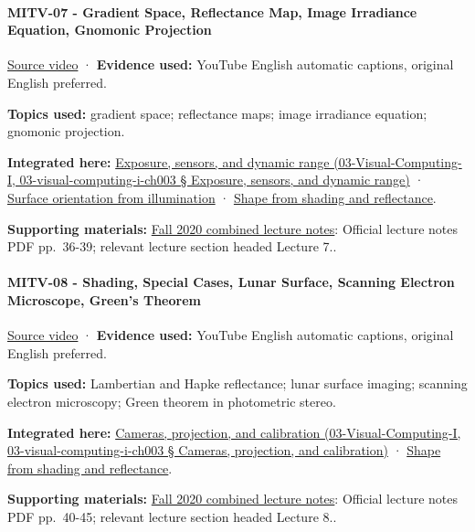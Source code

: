 \paragraph{MITV-07 - Gradient Space, Reflectance Map, Image Irradiance Equation, Gnomonic Projection}\label{mitv-07---gradient-space-reflectance-map-image-irradiance-equation-gnomonic-projection}

\href{https://www.youtube.com/watch?v=qqtEQsBjh28}{Source video} · \textbf{Evidence used:} YouTube English automatic captions, original English preferred.

\textbf{Topics used:} gradient space; reflectance maps; image irradiance equation; gnomonic projection.

\textbf{Integrated here:} \href{}{Exposure, sensors, and dynamic range (03-Visual-Computing-I, 03-visual-computing-i-ch003 § Exposure, sensors, and dynamic range)} · \hyperref[04-visual-computing-ii-ch032]{Surface orientation from illumination} · \hyperref[04-visual-computing-ii-ch032]{Shape from shading and reflectance}.

\textbf{Supporting materials:} \href{https://ocw.mit.edu/courses/6-801-machine-vision-fall-2020/9ec44f69e72995c370b3797818ba01e6_MIT6_801F20_lectureNotes.pdf}{Fall 2020 combined lecture notes}: Official lecture notes PDF pp.~36-39; relevant lecture section headed Lecture 7..

\paragraph{MITV-08 - Shading, Special Cases, Lunar Surface, Scanning Electron Microscope, Green's Theorem}\label{mitv-08---shading-special-cases-lunar-surface-scanning-electron-microscope-greens-theorem}

\href{https://www.youtube.com/watch?v=LP7z6vVmnms}{Source video} · \textbf{Evidence used:} YouTube English automatic captions, original English preferred.

\textbf{Topics used:} Lambertian and Hapke reflectance; lunar surface imaging; scanning electron microscopy; Green theorem in photometric stereo.

\textbf{Integrated here:} \href{}{Cameras, projection, and calibration (03-Visual-Computing-I, 03-visual-computing-i-ch003 § Cameras, projection, and calibration)} · \hyperref[04-visual-computing-ii-ch032]{Shape from shading and reflectance}.

\textbf{Supporting materials:} \href{https://ocw.mit.edu/courses/6-801-machine-vision-fall-2020/9ec44f69e72995c370b3797818ba01e6_MIT6_801F20_lectureNotes.pdf}{Fall 2020 combined lecture notes}: Official lecture notes PDF pp.~40-45; relevant lecture section headed Lecture 8..

